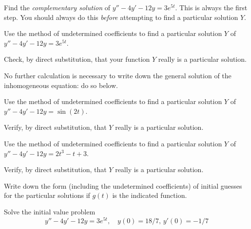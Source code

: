 \documentclass[11pt]{exam}
\begin{document}
\begin{questions}

\question Find the \emph{complementary solution} of $y'' - 4y' - 12y = 3e^{5t}$. This is always the first step. You should always do this \emph{before} attempting to find a particular solution $Y$.


\question Use the method of undetermined coefficients to find a particular solution $Y$ of $y'' - 4y' - 12y = 3e^{5t}$.


\question Check, by direct substitution, that your function $Y$ really is a particular solution.


\question No further calculation is necessary to write down the general solution of the inhomogeneous equation: do so below.

\newpage

\question Use the method of undetermined coefficients to find a particular solution $Y$ of $y'' - 4y' - 12y = \sin{(2t)}$. 


\question Verify, by direct substitution, that $Y$ really is a particular solution.


\question Use the method of undetermined coefficients to find a particular solution $Y$ of $y'' - 4y' - 12y = 2t^3 - t + 3$.


\question Verify, by direct substitution, that $Y$ really is a particular solution.

\newpage

\question Write down the form (including the undetermined coefficients) of initial guesses for the particular solutions if $g(t)$ is the indicated function.



\question Solve the initial value problem 
\[
    y'' - 4y' - 12y = 3e^{5t}, \quad y(0) = 18/7,\, y'(0) = -1/7
\]


\end{questions}
\end{document}
